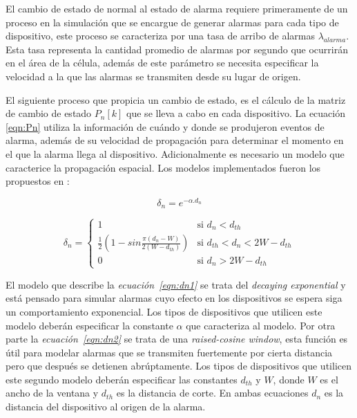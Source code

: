 El cambio de estado de normal  al estado de alarma requiere primeramente de un proceso en la simulación que se encargue de generar alarmas para cada tipo de dispositivo, este proceso se caracteriza por una tasa de arribo de alarmas $ \lambda_{alarma}$. Esta tasa representa la cantidad promedio de alarmas por segundo que ocurrirán en el área de la célula, además de este parámetro se necesita especificar la velocidad a la que las alarmas se transmiten desde su lugar de origen.\newline

El siguiente proceso que propicia un cambio de estado, es el cálculo de la matriz de cambio de estado $P_n\left[k\right]$ que se lleva a cabo en cada dispositivo. La ecuación \ref{eqn:Pn} utiliza la información de cuándo y donde se produjeron eventos de alarma, además de su velocidad de propagación para determinar el momento en el que la alarma llega al dispositivo. Adicionalmente es necesario un modelo que caracterice la propagación espacial. Los modelos implementados fueron los propuestos en \parencite{Gupta2018} :\newline

\begin{equation}
\delta_n = e^{-\alpha.d_{n}}
\label{eqn:dn1}
\end{equation}

\begin{equation}
    \delta_n =
    \begin{cases}
        1  & \text{si $d_n < d_{th}$} \\
        \frac{1}{2}(1-sin\frac{\pi(d_n-W)}{2(W-d_{th})}) & \text{si $d_{th}< d_n < 2W-d_{th}$}\\
        0  & \text{si $d_n > 2W-d_{th}$}
    \end{cases}
    \label{eqn:dn2}
\end{equation}

El modelo que describe la \textit{ecuación~\ref{eqn:dn1}} se trata del \textit{decaying exponential} y está pensado para simular alarmas cuyo efecto en los dispositivos se espera siga un comportamiento exponencial. Los tipos de dispositivos que utilicen este modelo deberán especificar la constante $\alpha$ que caracteriza al modelo. Por otra parte la \textit{ecuación~\ref{eqn:dn2}} se trata de una \textit{raised-cosine window}, esta función es útil para modelar alarmas que se transmiten fuertemente por cierta distancia pero que después se detienen abrúptamente. Los tipos de dispositivos que utilicen este segundo modelo deberán especificar las constantes $d_{th}$ y $W$, donde $W$ es el ancho de la ventana y $d_{th}$ es la distancia de corte. En ambas ecuaciones $d_n$ es la distancia del dispositivo al origen de la alarma.\newline

